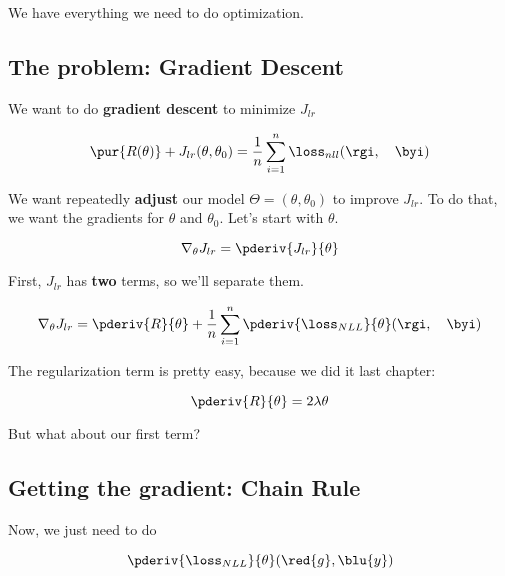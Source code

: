     We have everything we need to do optimization.
    
    \subsection*{The problem: Gradient Descent}
    
        We want to do \textbf{gradient descent} to minimize $J_{lr}$
        
        \begin{equation}
            \pur{ R(\theta) }
            +
            J_{lr}(\theta,\theta_0)
            =
            \frac{1}{n}
            \sum_{i=1}^n 
            \loss_{nll}(\rgi ,\quad \byi)
        \end{equation}
        
        We want repeatedly \textbf{adjust} our model $\Theta=(\theta,\theta_0)$ to improve $J_{lr}$. To do that, we want the gradients for $\theta$ and $\theta_0$. Let's start with $\theta$.
        
        \begin{equation}
            \nabla_\theta J_{lr} = \pderiv{J_{lr}}{\theta}
        \end{equation}
        
        First, $J_{lr}$ has \textbf{two} terms, so we'll separate them.
        
        \begin{equation}
            \nabla_\theta J_{lr} = 
            \pderiv{R}{\theta} + \frac{1}{n} \sum_{i=1}^{n }
                \pderiv{\loss_{NLL}}{\theta} (\rgi ,\quad \byi)
        \end{equation}
        
        The regularization term is pretty easy, because we did it last chapter:
        
        \begin{equation}
            \pderiv{R}{\theta} = 2 \lambda \theta
        \end{equation}
        
        But what about our first term?
    
    \subsection*{Getting the gradient: Chain Rule}
    
        Now, we just need to do
        
        \begin{equation}
            \pderiv{\loss_{NLL}}{\theta} (\red{g} , \blu{y})
        \end{equation}
    
